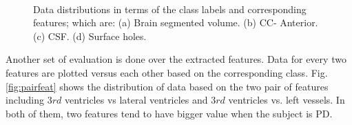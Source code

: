 \documentclass[runningheads,a4paper]{llncs}
\begin{document}
\begin{figure}[h]\small
  \centering
  \hfill
  \\
  \hfill
  \caption{Data distributions in terms of the class labels and corresponding features; which are: (a) Brain segmented volume. (b) CC- Anterior. (c) CSF. (d) Surface holes.}\setlength{\belowcaptionskip}{0pt}
  \label{fig:feateval}
\end{figure}
Another set of evaluation is done over the extracted features. Data for every two features are plotted versus each other based on the corresponding class. Fig.\ref{fig:pairfeat} shows the distribution of data based on the two pair of features including $3rd$ ventricles vs lateral ventricles and $3rd$ ventricles vs. left vessels. In both of them, two features tend to have bigger value when the subject is PD.
\end{document}
